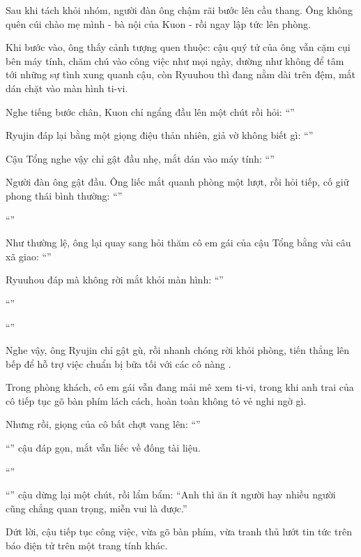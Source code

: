 \documentclass[../main.tex]{subfiles}
\begin{document}
Sau khi tách khỏi nhóm, người đàn ông chậm rãi bước lên cầu thang. Ông không quên cúi chào mẹ mình - bà nội của Kuon - rồi ngay lập tức lên phòng.

Khi bước vào, ông thấy cảnh tượng quen thuộc: cậu quý tử của ông vẫn cặm cụi bên máy tính, chăm chú vào công việc như mọi ngày, dường như không để tâm tới những sự tình xung quanh cậu, còn Ryuuhou thì đang nằm dài trên đệm, mắt dán chặt vào màn hình ti-vi.

Nghe tiếng bước chân, Kuon chỉ ngẩng đầu lên một chút rồi hỏi: ``''

Ryujin đáp lại bằng một giọng điệu thản nhiên, giả vờ không biết gì: ``''

Cậu Tổng nghe vậy chỉ gật đầu nhẹ, mắt dán vào máy tính: ``''

Người đàn ông gật đầu. Ông liếc mắt quanh phòng một lượt, rồi hỏi tiếp, cố giữ phong thái bình thường: ``''

``''

Như thường lệ, ông lại quay sang hỏi thăm cô em gái của cậu Tổng bằng vài câu xã giao: ``''

Ryuuhou đáp mà không rời mắt khỏi màn hình: ``''

``''

``''

Nghe vậy, ông Ryujin chỉ gật gù, rồi nhanh chóng rời khỏi phòng, tiến thẳng lên bếp để hỗ trợ việc chuẩn bị bữa tối với các cô nàng \hll.

Trong phòng khách, cô em gái vẫn đang mải mê xem ti-vi, trong khi anh trai của cô tiếp tục gõ bàn phím lách cách, hoàn toàn không tỏ vẻ nghi ngờ gì.

Nhưng rồi, giọng của cô bất chợt vang lên: ``''

``'' cậu đáp gọn, mắt vẫn liếc về đống tài liệu.

``''

``'' cậu dừng lại một chút, rồi lẩm bẩm: ``Anh thì ăn ít người hay nhiều người cũng chẳng quan trọng, miễn vui là được.''

Dứt lời, cậu tiếp tục công việc, vừa gõ bàn phím, vừa tranh thủ lướt tin tức trên báo điện tử trên một trang tính khác.
\end{document}
